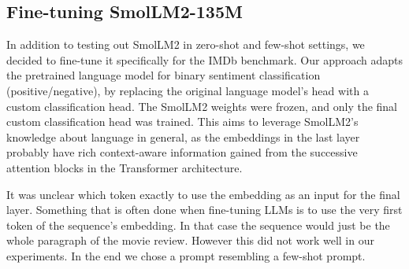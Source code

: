 \documentclass[10pt,twocolumn,letterpaper]{article}
\begin{document}
\begin{table}
\begin{center}
\end{center}
\caption{Few-shot prompts used to test default SmolLM2 models.}
\label{tab:few-shot-prompts}
\end{table}




\subsection{Fine-tuning SmolLM2-135M}
\label{sec:ft_setup}

In addition to testing out SmolLM2 in zero-shot and few-shot settings, we decided to fine-tune it specifically for the IMDb benchmark. Our approach adapts the pretrained language model for binary sentiment classification (positive/negative), by replacing the original language model's head with a custom classification head. The SmolLM2 weights were frozen, and only the final custom classification head was trained.
This aims to leverage SmolLM2's knowledge about language in general, as the embeddings in the last layer probably have rich context-aware information gained from the successive attention blocks in the Transformer architecture.

It was unclear which token exactly to use the embedding as an input for the final layer. Something that is often done when fine-tuning LLMs is to use the very first token of the sequence's embedding. In that case the sequence would just be the whole paragraph of the movie review. However this did not work well in our experiments.
In the end we chose a prompt resembling a few-shot prompt.
\end{document}
